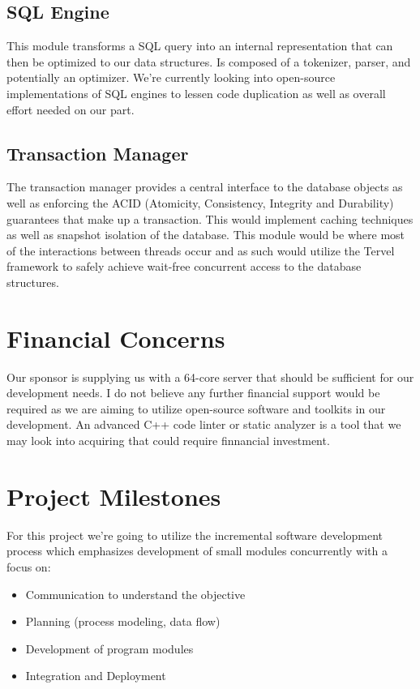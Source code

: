 \documentclass[letterpaper]{article}
\begin{document}
  \subsection{SQL Engine}
  This module transforms a SQL query into an internal representation that can then be optimized to our data structures. Is composed of a tokenizer,
  parser, and potentially an optimizer. We're currently looking into open-source implementations of SQL engines to lessen code duplication as well
  as overall effort needed on our part.
  
  \subsection{Transaction Manager}
  The transaction manager provides a central interface to the database objects as well as enforcing the ACID (Atomicity, Consistency, Integrity
  and Durability) guarantees that make up a transaction. This would implement caching techniques as well as snapshot isolation of the
  database. This module would be where most of the interactions between threads occur and as such would utilize the Tervel framework to 
  safely achieve wait-free concurrent access to the database structures.
  
  \section{Financial Concerns}
  Our sponsor is supplying us with a 64-core server that should be sufficient for our development needs. I do not believe any further financial
  support would be required as we are aiming to utilize open-source software and toolkits in our development. An advanced C++ code linter or static
  analyzer is a tool that we may look into acquiring that could require finnancial investment.
  
  \section{Project Milestones}
  For this project we're going to utilize the incremental software development process which emphasizes development of small modules concurrently
  with a focus on:
  \begin{itemize}
   \item Communication to understand the objective
   \item Planning (process modeling, data flow)
   \item Development of program modules
   \item Integration and Deployment
  \end{itemize}
\end{document}
